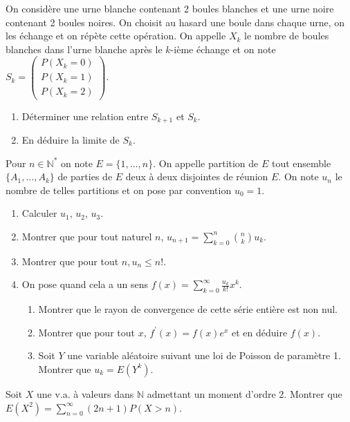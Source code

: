 \begin{exercice}
On considère une urne blanche contenant 2 boules blanches et une urne noire contenant 2 boules noires. On choisit au hasard une boule dans chaque urne, on les échange et on répète cette opération. On appelle $X_{k}$ le nombre de boules blanches dans l'urne blanche après le $k$-ième échange et on note $S_{k}=\begin{pmatrix} P(X_{k}=0) \\ P(X_{k}=1) \\ P(X_{k}=2) \end{pmatrix}$.
\begin{enumerate}
    \item Déterminer une relation entre $S_{k+1}$ et $S_{k}$.
    \item En déduire la limite de $S_{k}$.
\end{enumerate}
\end{exercice}

\begin{exercice}
Pour $n\in\mathbb{N}^{*}$ on note $E=\{1,\dots,n\}$. On appelle partition de $E$ tout ensemble $\{A_{1},\dots,A_{k}\}$ de parties de $E$ deux à deux disjointes de réunion $E$.
On note $u_{n}$ le nombre de telles partitions et on pose par convention $u_{0}=1$.
\begin{enumerate}
    \item Calculer $u_{1}$, $u_{2}$, $u_{3}$.
    \item Montrer que pour tout naturel $n$, $u_{n+1}=\sum_{k=0}^{n}\binom{n}{k}u_{k}$.
    \item Montrer que pour tout $n, u_{n}\le n!$.
    \item On pose quand cela a un sens $f(x)=\sum_{k=0}^{\infty}\frac{u_{k}}{k!}x^{k}$.
    \begin{enumerate}
        \item Montrer que le rayon de convergence de cette série entière est non nul.
        \item Montrer que pour tout $x$, $f^{\prime}(x)=f(x)e^{x}$ et en déduire $f(x)$.
        \item Soit $Y$ une variable aléatoire suivant une loi de Poisson de paramètre 1. Montrer que $u_{k}=E(Y^{k})$.
    \end{enumerate}
\end{enumerate}
\end{exercice}

\begin{exercice}
Soit $X$ une v.a. à valeurs dans $\mathbb{N}$ admettant un moment d'ordre 2. Montrer que $E(X^{2})=\sum_{n=0}^{\infty}(2n+1)P(X>n)$.
\end{exercice}

